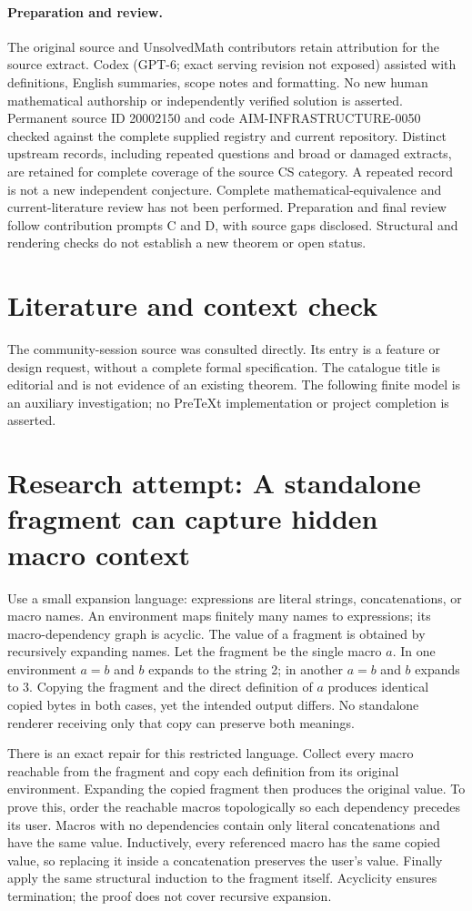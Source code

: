 \documentclass[11pt]{article}
\begin{document}
\paragraph{Preparation and review.}
The original source and UnsolvedMath contributors retain attribution for the source extract. Codex (GPT-6; exact serving revision not exposed) assisted with definitions, English summaries, scope notes and formatting. No new human mathematical authorship or independently verified solution is asserted. Permanent source ID 20002150 and code AIM-INFRASTRUCTURE-0050 checked against the complete supplied registry and current repository. Distinct upstream records, including repeated questions and broad or damaged extracts, are retained for complete coverage of the source CS category. A repeated record is not a new independent conjecture. Complete mathematical-equivalence and current-literature review has not been performed. Preparation and final review follow contribution prompts C and D, with source gaps disclosed. Structural and rendering checks do not establish a new theorem or open status.
\label{end:20002150}

\section{Literature and context check}
The community-session source was consulted directly. Its entry is a feature or design request, without a complete formal specification. The catalogue title is editorial and is not evidence of an existing theorem. The following finite model is an auxiliary investigation; no PreTeXt implementation or project completion is asserted.
\section{Research attempt: A standalone fragment can capture hidden macro context}
Use a small expansion language: expressions are literal strings, concatenations, or macro names. An environment maps finitely many names to expressions; its macro-dependency graph is acyclic. The value of a fragment is obtained by recursively expanding names. Let the fragment be the single macro $a$. In one environment $a=b$ and $b$ expands to the string 2; in another $a=b$ and $b$ expands to 3. Copying the fragment and the direct definition of $a$ produces identical copied bytes in both cases, yet the intended output differs. No standalone renderer receiving only that copy can preserve both meanings.

There is an exact repair for this restricted language. Collect every macro reachable from the fragment and copy each definition from its original environment. Expanding the copied fragment then produces the original value. To prove this, order the reachable macros topologically so each dependency precedes its user. Macros with no dependencies contain only literal concatenations and have the same value. Inductively, every referenced macro has the same copied value, so replacing it inside a concatenation preserves the user's value. Finally apply the same structural induction to the fragment itself. Acyclicity ensures termination; the proof does not cover recursive expansion.
\end{document}
